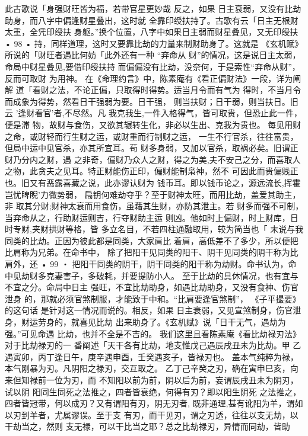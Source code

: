 此古歌说「身强财旺皆为福，若带官星更妙哉 反之，如果
日主衰弱，又没有比劫助身，而八字中偏逢财星叠出，这时就
全靠印绶扶持了。古歌有云「日主无根财太重，全凭印绶扶
身躯。”换个位置，八字中如果日主弱而财星叠见，又无印绶扶
• 98 •
持，同样道理，这时又要靠比劫的力量来制财助身了。这就是
《玄机赋》所说的「财旺者遇比何妨「此外还有一种 “弃命从
财”的情况，这是说日主太弱，命局中财星叠见,要借印绶扶持
而偏偏没有比劫，没奈何，于是索性“弃命从财”，反而可取财
为用神。
在《命理约言》中，陈素庵有《看正偏财法》一段，详为阐解
道「看财之法，不论正偏，只取得时得势。适当月令而有气为
得时，不当月令而成象为得势，然看日干强弱为要。日干强，
则当扶财；日干弱，则当扶日。旧云 '逢财看官'者,不尽然。凡
我克我生,一件入格得气，皆可取贵，但恐止此一件，便是滞
物，故财与食伤，又欲其辗转生化，非必以生出、克我为贵也。
每见用财之命，或财轻而行生财之运，或财重而行制财之运，
一生不行官杀，往往富贵，但局中运中见官杀，亦其所宜耳。苟
财多身弱，又加以官杀，取祸必矣。旧谓正财乃分内之财，遇
之非奇，偏财乃众人之财，得之为美,夫不安己之分，而喜取人
之物，此贪夫之见耳。特正财能伤正印，偏财能制枭神，然不
可因此而贵偏贱正也。旧又有恶露喜藏之说，此亦谬认财为
钱币耳。即以钱币论之，源远流长,挥霍岂忧睥睨'力微势弱，
扃钥何难劫夺乎？至于财神太旺，而用比劫，盖爱其助主，非
取其分财;财神太衰而用食伤，虽藉其生财，亦防其泄主。若
财多而强不可制，当弃命从之，行助财运则吉，行夺财助主运
则凶。他如时上偏财，时上财库，日时专财,夹财拱财等格，皆
多立名目，不若四柱通融取用，较为简当也「
末说与我同类的比劫。正因为彼此都是同类，大家肩比
着肩，高低差不了多少，所以便把比肩称为兄弟。在命书中，
除了把阳干见同类的阳干、阴干见同类的阴干称为比肩外，还
• 99 ・
把阳干同类的阴干，阴干同类的阳干称为劫财。命书认为，命
中见劫财多克妻害子，多破耗，并要提防小人。
至于比劫的具休情况，也有宜与不宜之分。命局中日主
强旺，不宜比劫助身，如遇比劫助身，又没有食神、伤官泄身
的，那就必须官煞制服，才能致于中和。“比肩要逢官煞制”，
《子平撮要》的这句话 是针对这一情况而说的。相反，如果
日主衰弱，又见宣煞制身，伤官泄身，财运劳身的，就喜见比劫
出来助身了。《玄机赋》说「日干无气，遇劫为强。”可见命遇
比劫，也并不全是不吉的。
我们这里且看陈素庵《看比劫禄刃法》对于比劫禄刃的一
番阐述「天干各有比劫，地支惟戊己遇辰戌丑未为比劫。甲
乙遇寅卯，丙丁逢日午，庚辛遇申酉，壬癸遇亥子，皆禄刃也。
盖本气纯粹为禄，本气刚暴为刃。凡阴阳之禄刃，交互取之。
乙丁己辛癸之刃，确在寅申巳亥，向来但知禄前一位为刃，而
不知阳以前为前，阴以后为前，妄谓辰戌丑未为阴刃，试以阴
阳同生同死之法推之，四者皆衰绝，何得有刃？即以阳生阴死
之法推之，四者皆冠带，何以成刃？又有谓阳有刃，阴无刃者,
既非通理,甚有讹阳为羊，谓如以刃到羊者，尤属谬误。至于支
有刃，而干见刃，谓之刃透，往往以支无劫，以干劫当之，然则
支无禄，可以干比当之耶？总之比劫禄刃，异情而同劫，皆助
